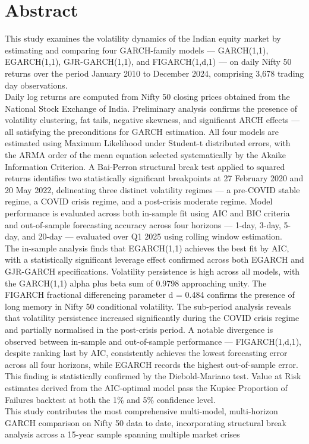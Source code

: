 \chapter*{Abstract}
This study examines the volatility dynamics of the Indian equity market by estimating and comparing four GARCH-family models — GARCH(1,1), EGARCH(1,1), GJR-GARCH(1,1), and FIGARCH(1,d,1) — on daily Nifty 50 returns over the period January 2010 to December 2024, comprising 3,678 trading day observations.\\
Daily log returns are computed from Nifty 50 closing prices obtained from the National Stock Exchange of India. Preliminary analysis confirms the presence of volatility clustering, fat tails, negative skewness, and significant ARCH effects — all satisfying the preconditions for GARCH estimation. All four models are estimated using Maximum Likelihood under Student-t distributed errors, with the ARMA order of the mean equation selected systematically by the Akaike Information Criterion. A Bai-Perron structural break test applied to squared returns identifies two statistically significant breakpoints at 27 February 2020 and 20 May 2022, delineating three distinct volatility regimes — a pre-COVID stable regime, a COVID crisis regime, and a post-crisis moderate regime. Model performance is evaluated across both in-sample fit using AIC and BIC criteria and out-of-sample forecasting accuracy across four horizons — 1-day, 3-day, 5-day, and 20-day — evaluated over Q1 2025 using rolling window estimation.\\
The in-sample analysis finds that EGARCH(1,1) achieves the best fit by AIC, with a statistically significant leverage effect confirmed across both EGARCH and GJR-GARCH specifications. Volatility persistence is high across all models, with the GARCH(1,1) alpha plus beta sum of 0.9798 approaching unity. The FIGARCH fractional differencing parameter d = 0.484 confirms the presence of long memory in Nifty 50 conditional volatility. The sub-period analysis reveals that volatility persistence increased significantly during the COVID crisis regime and partially normalised in the post-crisis period. A notable divergence is observed between in-sample and out-of-sample performance — FIGARCH(1,d,1), despite ranking last by AIC, consistently achieves the lowest forecasting error across all four horizons, while EGARCH records the highest out-of-sample error. This finding is statistically confirmed by the Diebold-Mariano test. Value at Risk estimates derived from the AIC-optimal model pass the Kupiec Proportion of Failures backtest at both the 1\% and 5\% confidence level.\\
 This study contributes the most comprehensive multi-model, multi-horizon GARCH comparison on Nifty 50 data to date, incorporating structural break analysis across a 15-year sample spanning multiple market crises

